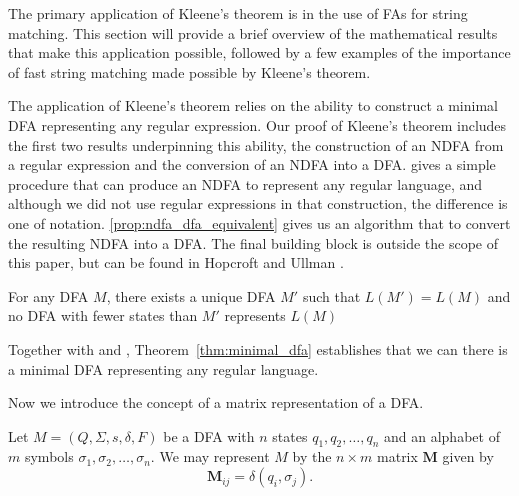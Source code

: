 \documentclass{bcthesis}
\renewcommand{\meo}[1]{}
\newcommand{\footcite}[2]{\xspace\cite[pg.~{#2}]{#1}\xspace}
\begin{document}
	\meo{
		Figure out if there are any other parts of the proof that deserve an example to help explain them.
		I will probably include pictures for regular language $\iff$ representable in the initial proof.
	}


\label{sec:motivation}

	The primary application of Kleene's theorem is in the use of FAs for string matching.
	This section will provide a brief overview of the mathematical results that make this application possible, followed by a few examples of the importance of fast string matching made possible by Kleene's theorem.

	The application of Kleene's theorem relies on the ability to construct a minimal DFA representing any regular expression.
	Our proof of Kleene's theorem includes the first two results underpinning this ability, the construction of an NDFA from a regular expression and the conversion of an NDFA into a DFA. 
	 gives a simple procedure that can produce an NDFA to represent any regular language, and although we did not use regular expressions in that construction, the difference is one of notation.
	\ref{prop:ndfa_dfa_equivalent} gives us an algorithm that to convert the resulting NDFA into a DFA.
	The final building block is outside the scope of this paper, but can be found in Hopcroft and Ullman \footcite{hopcroft}{67--70}. 

	\begin{theorem}
	\label{thm:minimal_dfa}
		For any DFA $M$, there exists a unique DFA $M'$ such that $L(M') = L(M)$ and no DFA with fewer states than $M'$ represents $L(M)$
	\end{theorem}

	Together with  and , Theorem~\ref{thm:minimal_dfa} establishes that we can there is a minimal DFA representing any regular language.

	Now we introduce the concept of a matrix representation of a DFA.

	\begin{definition}
		Let $M = (Q, \Sigma, s, \delta, F)$ be a DFA with $n$ states $q_1, q_2, \dots, q_n$ and an alphabet of $m$ symbols $\sigma_1, \sigma_2, \dots, \sigma_n$.
		We may represent $M$ by the $n \times m$ matrix $\mathbf{M}$ given by 
		\[
			\mathbf{M}_{ij} = \delta(q_i, \sigma_j).
		\]
	\end{definition}
\end{document}
